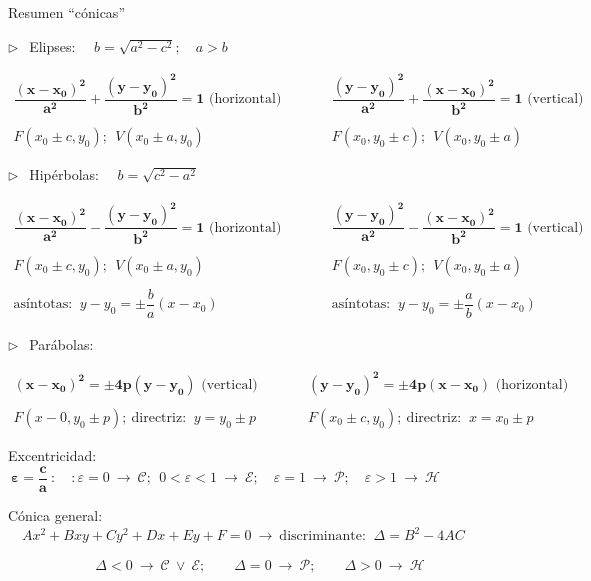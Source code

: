 \begin{myblock}{Resumen ``cónicas''}

\vspace{2mm} $\triangleright \ \ $ Elipses: $\quad b=\sqrt{a^2-c^2};\quad a>b$

\vspace{4mm} $\begin{array}{ccc}
\boldsymbol{\dfrac{(x-x_0)^2}{a^2} + \dfrac{(y-y_0)^2}{b^2} = 1 } \text{ (horizontal)}
& \qquad & 
\boldsymbol{\dfrac{(y-y_0)^2}{a^2} + \dfrac{(x-x_0)^2}{b^2} = 1 } \text{ (vertical)} \\ \\
F(x_0\pm c, y_0);\ \ V(x_0\pm a, y_0) & \qquad & F(x_0,y_0\pm c);\ \ V(x_0,y_0\pm a)
\end{array} $


\vspace{8mm} $\triangleright \ \ $ Hipérbolas: $\quad b=\sqrt{c^2-a^2}$

\vspace{4mm} $\begin{array}{ccc}
\boldsymbol{\dfrac{(x-x_0)^2}{a^2} - \dfrac{(y-y_0)^2}{b^2} = 1 } \text{ (horizontal)}
& \qquad & 
\boldsymbol{\dfrac{(y-y_0)^2}{a^2} - \dfrac{(x-x_0)^2}{b^2} = 1 } \text{ (vertical)} \\ \\
F(x_0\pm c, y_0);\ \ V(x_0\pm a, y_0) & \qquad & F(x_0,y_0\pm c);\ \ V(x_0,y_0\pm a) \\ \\
\text{asíntotas: } \ y-y_0=\pm \dfrac b a (x-x_0) &\qquad & \text{asíntotas: } \ y-y_0=\pm \dfrac a b (x-x_0)
\end{array} $

\vspace{8mm} $\triangleright \ \ $ Parábolas: 


\vspace{4mm}$\begin{array}{ccc}
\boldsymbol{(x-x_0)^2=\pm 4p(y-y_0)}	\text{ (vertical)} &\qquad & \boldsymbol{(y-y_0)^2=\pm 4p(x-x_0)}	\text{ (horizontal)} \\ \\
F(x-0,y_0\pm p);\ \text{directriz: }\ y=y_0\pm p &\qquad & 
F(x_0\pm c,y_0);\ \text{directriz: }\ x=x_0\pm p 
\end{array}$


\vspace{12mm} Excentricidad: $\ \boldsymbol{\varepsilon=\dfrac c a}\ : \quad: \varepsilon=0\ \to \ \mathcal C;\ \ 0<\varepsilon<1 \ \to \ \mathcal E;\quad \varepsilon=1 \ \to \ \mathcal P;\quad \varepsilon>1 \ \to \ \mathcal H$

\vspace{10mm} Cónica general: $\quad Ax^2+Bxy+Cy^2+Dx+Ey+F=0 \ \to \ \text{discriminante: } \ \Delta=B^2-4AC$ 

$$\Delta<0 \ \to \ \mathcal C \ \vee \ \mathcal E;\qquad \Delta=0 \ \to \ \mathcal P;\qquad \Delta>0 \ \to \ \mathcal H $$
	
\end{myblock}






